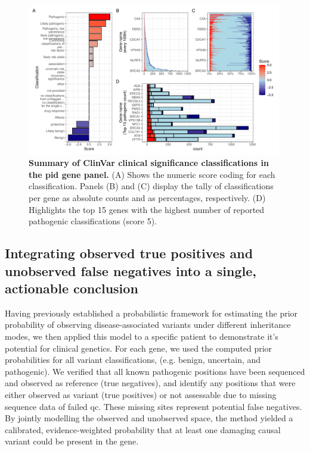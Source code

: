\begin{figure}[ht]
  \centering
  \includegraphics[width=0.99\textwidth]{../images/p_varRisEst_summary_scores.pdf}
  \caption{\textbf{Summary of ClinVar clinical significance classifications in the \ac{pid} gene panel.} (A) Shows the numeric score coding for each classification. Panels (B) and (C) display the tally of classifications per gene as absolute counts and as percentages, respectively. (D) Highlights the top 15 genes with the highest number of reported pathogenic classifications (score 5).}
  \label{fig:p_varRisEst_summary_scores}
\end{figure}

\subsection{Integrating observed true positives and unobserved false negatives into a single, actionable conclusion}

Having previously established a probabilistic framework for estimating the prior probability of observing disease-associated variants under different inheritance modes, we then applied this model to a specific patient to demonstrate it's potential for clinical genetics.
For each gene, we used the computed prior probabilities for all variant classifications, (e.g. benign, uncertain, and pathogenic). 
We verified that all known pathogenic positions have been sequenced and observed as reference (true negatives), and identify any positions that were either observed as variant (true positives) or not assessable due to missing sequence data of failed \ac{qc}. 
These missing sites represent potential false negatives. By jointly modelling the observed and unobserved space, the method yielded a calibrated, evidence-weighted probability that at least one damaging causal variant could be present in the gene.

